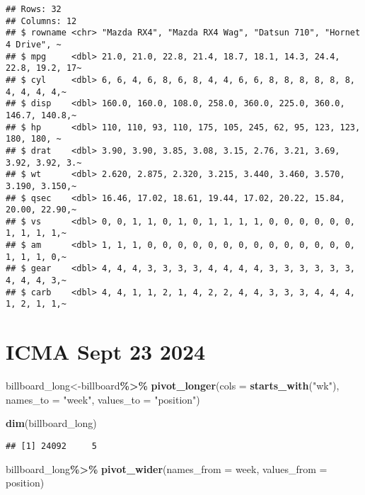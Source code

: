 \documentclass[
]{article}
\newenvironment{Shaded}{\begin{snugshade}}{\end{snugshade}}
\newcommand{\AttributeTok}[1]{\textcolor[rgb]{0.13,0.29,0.53}{#1}}
\newcommand{\FunctionTok}[1]{\textcolor[rgb]{0.13,0.29,0.53}{\textbf{#1}}}
\newcommand{\NormalTok}[1]{#1}
\newcommand{\OtherTok}[1]{\textcolor[rgb]{0.56,0.35,0.01}{#1}}
\newcommand{\SpecialCharTok}[1]{\textcolor[rgb]{0.81,0.36,0.00}{\textbf{#1}}}
\newcommand{\StringTok}[1]{\textcolor[rgb]{0.31,0.60,0.02}{#1}}
\begin{document}
\begin{verbatim}
## Rows: 32
## Columns: 12
## $ rowname <chr> "Mazda RX4", "Mazda RX4 Wag", "Datsun 710", "Hornet 4 Drive", ~
## $ mpg     <dbl> 21.0, 21.0, 22.8, 21.4, 18.7, 18.1, 14.3, 24.4, 22.8, 19.2, 17~
## $ cyl     <dbl> 6, 6, 4, 6, 8, 6, 8, 4, 4, 6, 6, 8, 8, 8, 8, 8, 8, 4, 4, 4, 4,~
## $ disp    <dbl> 160.0, 160.0, 108.0, 258.0, 360.0, 225.0, 360.0, 146.7, 140.8,~
## $ hp      <dbl> 110, 110, 93, 110, 175, 105, 245, 62, 95, 123, 123, 180, 180, ~
## $ drat    <dbl> 3.90, 3.90, 3.85, 3.08, 3.15, 2.76, 3.21, 3.69, 3.92, 3.92, 3.~
## $ wt      <dbl> 2.620, 2.875, 2.320, 3.215, 3.440, 3.460, 3.570, 3.190, 3.150,~
## $ qsec    <dbl> 16.46, 17.02, 18.61, 19.44, 17.02, 20.22, 15.84, 20.00, 22.90,~
## $ vs      <dbl> 0, 0, 1, 1, 0, 1, 0, 1, 1, 1, 1, 0, 0, 0, 0, 0, 0, 1, 1, 1, 1,~
## $ am      <dbl> 1, 1, 1, 0, 0, 0, 0, 0, 0, 0, 0, 0, 0, 0, 0, 0, 0, 1, 1, 1, 0,~
## $ gear    <dbl> 4, 4, 4, 3, 3, 3, 3, 4, 4, 4, 4, 3, 3, 3, 3, 3, 3, 4, 4, 4, 3,~
## $ carb    <dbl> 4, 4, 1, 1, 2, 1, 4, 2, 2, 4, 4, 3, 3, 3, 4, 4, 4, 1, 2, 1, 1,~
\end{verbatim}

\section{ICMA Sept 23 2024}\label{icma-sept-23-2024}

\begin{Shaded}
\begin{Highlighting}[]
\NormalTok{billboard\_long}\OtherTok{\textless{}{-}}\NormalTok{billboard}\SpecialCharTok{\%\textgreater{}\%}
  \FunctionTok{pivot\_longer}\NormalTok{(}\AttributeTok{cols =} \FunctionTok{starts\_with}\NormalTok{(}\StringTok{"wk"}\NormalTok{), }
               \AttributeTok{names\_to =} \StringTok{"week"}\NormalTok{, }
               \AttributeTok{values\_to =} \StringTok{"position"}\NormalTok{)}
\end{Highlighting}
\end{Shaded}

\begin{Shaded}
\begin{Highlighting}[]
\FunctionTok{dim}\NormalTok{(billboard\_long)}
\end{Highlighting}
\end{Shaded}

\begin{verbatim}
## [1] 24092     5
\end{verbatim}

\begin{Shaded}
\begin{Highlighting}[]
\NormalTok{billboard\_long}\SpecialCharTok{\%\textgreater{}\%}
  \FunctionTok{pivot\_wider}\NormalTok{(}\AttributeTok{names\_from =}\NormalTok{ week, }\AttributeTok{values\_from =}\NormalTok{ position)}
\end{Highlighting}
\end{Shaded}
\end{document}
